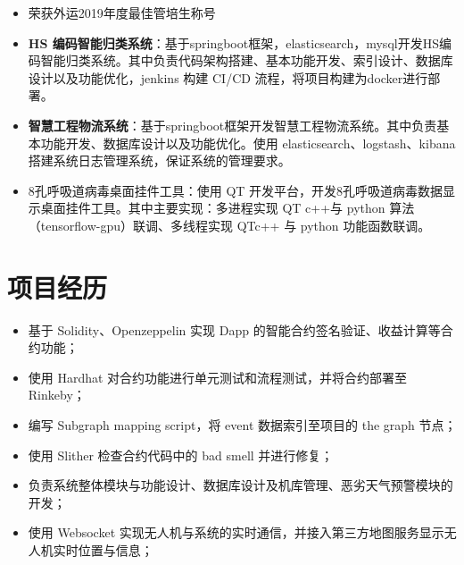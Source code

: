 \documentclass{resume}
\begin{document}
\begin{itemize}[parsep=0.5ex]
  \item 荣获外运2019年度最佳管培生称号
  \item \textbf{HS 编码智能归类系统}：基于springboot框架，elasticsearch，mysql开发HS编码智能归类系统。其中负责代码架构搭建、基本功能开发、索引设计、数据库设计以及功能优化，jenkins 构建 CI/CD 流程，将项目构建为docker进行部署。
  \item \textbf{智慧工程物流系统}：基于springboot框架开发智慧工程物流系统。其中负责基本功能开发、数据库设计以及功能优化。使用 elasticsearch、logstash、kibana 搭建系统日志管理系统，保证系统的管理要求。
\end{itemize}

\begin{itemize}[parsep=0.5ex]
  \item 8孔呼吸道病毒桌面挂件工具：使用 QT 开发平台，开发8孔呼吸道病毒数据显示桌面挂件工具。其中主要实现：多进程实现 QT c++与 python 算法（tensorflow-gpu）联调、多线程实现 QTc++ 与 python 功能函数联调。
\end{itemize}

\section{项目经历}
\begin{itemize}[parsep=0.5ex]
  \item 基于 Solidity、Openzeppelin 实现 Dapp 的智能合约签名验证、收益计算等合约功能；
  \item 使用 Hardhat 对合约功能进行单元测试和流程测试，并将合约部署至 Rinkeby；
  \item 编写 Subgraph mapping script，将 event 数据索引至项目的 the graph 节点；
  \item 使用 Slither 检查合约代码中的 bad smell 并进行修复；
\end{itemize}
\begin{itemize}[parsep=0.5ex]
  \item 负责系统整体模块与功能设计、数据库设计及机库管理、恶劣天气预警模块的开发；
  \item 使用 Websocket 实现无人机与系统的实时通信，并接入第三方地图服务显示无人机实时位置与信息；
\end{itemize}
\end{document}

